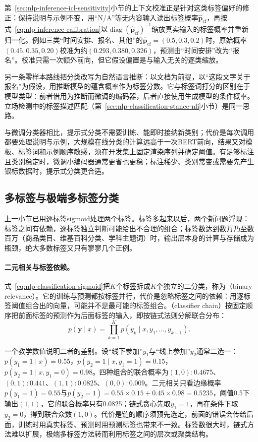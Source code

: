 第~\ref{sec:nlp-inference-icl-sensitivity}小节的上下文校准正是针对这类标签偏好的修正：保持说明与示例不变，用“N/A”等无内容输入读出标签概率$\hat{\bm p}_{\mathrm{cf}}$，再按式~\eqref{eq:nlp-inference-calibration}以$\operatorname{diag}(\hat{\bm p}_{\mathrm{cf}})^{-1}$缩放真实输入的标签概率并重新归一化。例如三类“时间安排、报名、其他”的$\hat{\bm p}_{\mathrm{cf}}=(0.5,0.3,0.2)$时，原始概率$(0.45,0.35,0.20)$校准为约$(0.293,0.380,0.326)$，预测由“时间安排”改为“报名”。校准只需一次额外前向，但它假设偏置是与输入无关的逐类缩放。

另一条零样本路线把分类改写为自然语言推断：以文档为前提，以“这段文字关于报名”为假设，用推断模型的蕴含概率作为标签分数。它与标签词打分的区别在于模型类型：前者借用为推断而微调的编码器，后者直接使用生成模型的条件概率。立场检测中的标签描述匹配（第~\ref{sec:nlp-classification-stance-nli}小节）是同一思路。

与微调分类器相比，提示式分类不需要训练、能即时接纳新类别；代价是每次调用都要处理说明与示例，大规模在线分类的计算远高于一次BERT前向，结果又对模板、标签词和示例顺序敏感，须在开发集上固定渲染序列并确定阈值。有足够标注且类别稳定时，微调小编码器通常更省也更稳；标注稀少、类别常变或需要先产生银标数据时，提示式分类更合适。

\subsection{多标签与极端多标签分类}
\label{sec:nlp-classification-multilabel}

上一小节已用逐标签sigmoid处理两个标签。标签多起来以后，两个新问题浮现：标签之间有依赖，逐标签独立判断可能给出不合理的组合；标签数达到数万乃至数百万（商品类目、维基百科分类、学科主题词）时，输出层本身的计算与存储成为瓶颈，绝大多数标签又只有寥寥几个正例。

\paragraph{二元相关与标签依赖。}式~\eqref{eq:nlp-classification-sigmoid}把$K$个标签拆成$K$个独立的二分类，称为（binary relevance）。它的训练与预测都按标签并行，代价是忽略标签之间的依赖：用逐标签阈值组合出的向量，可能并不是最可能的标签组合。（classifier chain）按固定顺序把前面标签的预测作为后面标签的输入，即按链式法则分解联合分布\cite{nlp-read2011classifierchains}：
\[
  p(\bm y\mid x)=\prod_{k=1}^{K}p(y_k\mid x,y_1,\ldots,y_{k-1}).
\]

一个教学数值说明二者的差别。设“线下参加”$y_1$与“线上参加”$y_2$通常二选一：$p(y_1=1\mid x)=0.55$，$p(y_2=1\mid x,y_1=1)=0.15$，$p(y_2=1\mid x,y_1=0)=0.98$。四种组合的联合概率为$(1,0):0.4675$、$(0,1):0.441$、$(1,1):0.0825$、$(0,0):0.009$。二元相关只看边缘概率$p(y_1=1)=0.55$与$p(y_2=1)=0.55\times0.15+0.45\times0.98=0.5235$，阈值0.5下输出$(1,1)$，它的联合概率只有0.0825；链式贪心先取$y_1=1$，再在条件下取$y_2=0$，得到联合众数$(1,0)$。代价是链的顺序须预先选定，前面的错误会传给后面，训练时用真实标签、预测时用预测标签也带来不一致。标签数很大时，链式方法难以扩展，极端多标签方法转而利用标签之间的层次或聚类结构。

